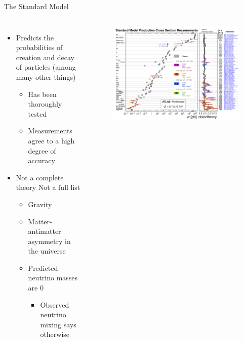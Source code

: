 \documentclass[aspectratio=169,xcolor=table]{beamer}
\begin{document}
  \begin{frame}[c]{The Standard Model}
    \begin{columns}
      \small
      \begin{itemize}
        \item Predicts the probabilities of creation and decay of particles (among many other things)
        \begin{itemize}
          \item Has been thoroughly tested
          \item Measurements agree to a high degree of accuracy
        \end{itemize}
        \item Not a complete theory {\small Not a full list}
        \begin{itemize}
          \item Gravity
          \item Matter-antimatter asymmetry in the universe
          \item Predicted neutrino masses are 0
          \begin{itemize}
            \item Observed neutrino mixing says otherwise
          \end{itemize}
        \end{itemize}
      \end{itemize}
      \begin{figure}
        \centering
        \includegraphics[width=\textwidth,keepaspectratio=true]{ATLAS_d_SMSummary_FiducialXsect_rotated.png}
      \end{figure}
    \end{columns}
  \end{frame}
\end{document}
